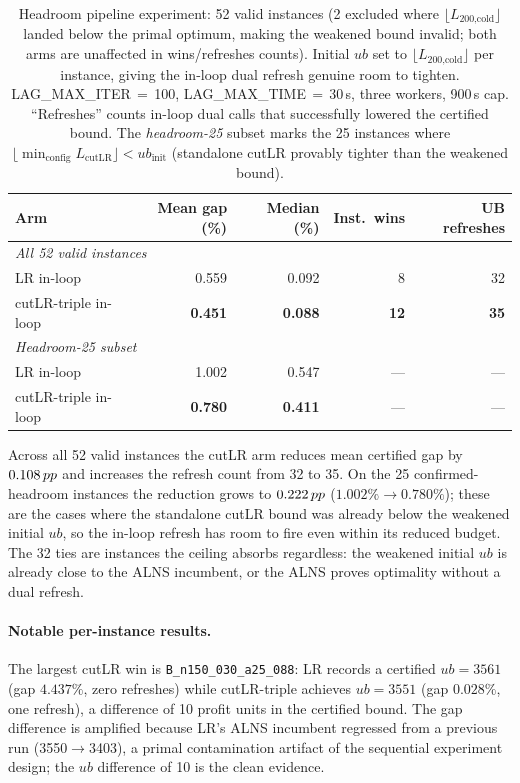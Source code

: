 \begin{table}[htbp]
\centering
\caption{Headroom pipeline experiment: 52 valid instances (2 excluded where
$\lfloor L_{\text{200,cold}}\rfloor$ landed below the primal optimum, making the
weakened bound invalid; both arms are unaffected in wins/refreshes counts).
Initial $ub$ set to $\lfloor L_{\text{200,cold}}\rfloor$ per instance, giving
the in-loop dual refresh genuine room to tighten.
LAG\_MAX\_ITER\,$=$\,100, LAG\_MAX\_TIME\,$=$\,30\,s, three workers, 900\,s cap.
``Refreshes'' counts in-loop dual calls that successfully lowered the certified
bound.  The \emph{headroom-25} subset marks the 25 instances where
$\lfloor \min_{\text{config}} L_{\text{cutLR}}\rfloor < ub_{\text{init}}$
(standalone cutLR provably tighter than the weakened bound).}
\label{tab:cutlr-headroom}
\small
\begin{tabular}{lrrrr}
\toprule
Arm & Mean gap (\%) & Median (\%) & Inst.\ wins & UB refreshes \\
\midrule
\multicolumn{5}{l}{\emph{All 52 valid instances}} \\
LR in-loop & 0.559 & 0.092 & 8 & 32 \\
cutLR-triple in-loop & \textbf{0.451} & \textbf{0.088} & \textbf{12} & \textbf{35} \\[4pt]
\multicolumn{5}{l}{\emph{Headroom-25 subset}} \\
LR in-loop & 1.002 & 0.547 & --- & --- \\
cutLR-triple in-loop & \textbf{0.780} & \textbf{0.411} & --- & --- \\
\bottomrule
\end{tabular}
\end{table}

Across all 52 valid instances the cutLR arm reduces mean certified gap by $0.108\,pp$
and increases the refresh count from 32 to 35.  On the 25 confirmed-headroom
instances the reduction grows to $0.222\,pp$ ($1.002\%\to 0.780\%$); these are
the cases where the standalone cutLR bound was already below the weakened
initial $ub$, so the in-loop refresh has room to fire even within its reduced
budget.  The 32 ties are instances the ceiling absorbs regardless: the weakened
initial $ub$ is already close to the ALNS incumbent, or the ALNS proves
optimality without a dual refresh.

\paragraph{Notable per-instance results.}
The largest cutLR win is \texttt{B\_n150\_030\_a25\_088}: LR records a
certified $ub=3561$ (gap $4.437\%$, zero refreshes) while cutLR-triple achieves
$ub=3551$ (gap $0.028\%$, one refresh), a difference of 10 profit units in the
certified bound.  The gap difference is amplified because LR's ALNS incumbent
regressed from a previous run (3550$\to$3403), a primal contamination artifact
of the sequential experiment design; the $ub$ difference of 10 is the clean
evidence.

